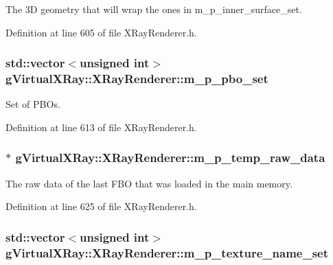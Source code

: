 The 3D geometry that will wrap the ones in m\_\-p\_\-inner\_\-surface\_\-set. 



Definition at line 605 of file XRayRenderer.h.

\hypertarget{classg_virtual_x_ray_1_1_x_ray_renderer_a3c98784b4ffd06d7dac0c43e20713b14}{
\subsubsection[{m\_\-p\_\-pbo\_\-set}]{\setlength{\rightskip}{0pt plus 5cm}std::vector$<$unsigned int$>$ {\bf gVirtualXRay::XRayRenderer::m\_\-p\_\-pbo\_\-set}}}
\label{classg_virtual_x_ray_1_1_x_ray_renderer_a3c98784b4ffd06d7dac0c43e20713b14}


Set of PBOs. 



Definition at line 613 of file XRayRenderer.h.

\hypertarget{classg_virtual_x_ray_1_1_x_ray_renderer_ad6c887c8da3342dffaa237115e9b933d}{
\subsubsection[{m\_\-p\_\-temp\_\-raw\_\-data}]{$\ast$ {\bf gVirtualXRay::XRayRenderer::m\_\-p\_\-temp\_\-raw\_\-data}}}
\label{classg_virtual_x_ray_1_1_x_ray_renderer_ad6c887c8da3342dffaa237115e9b933d}


The raw data of the last FBO that was loaded in the main memory. 



Definition at line 625 of file XRayRenderer.h.

\hypertarget{classg_virtual_x_ray_1_1_x_ray_renderer_a1075d6644118669ee6948eab5ee82f85}{
\subsubsection[{m\_\-p\_\-texture\_\-name\_\-set}]{\setlength{\rightskip}{0pt plus 5cm}std::vector$<$unsigned int$>$ {\bf gVirtualXRay::XRayRenderer::m\_\-p\_\-texture\_\-name\_\-set}}}
\label{classg_virtual_x_ray_1_1_x_ray_renderer_a1075d6644118669ee6948eab5ee82f85}


